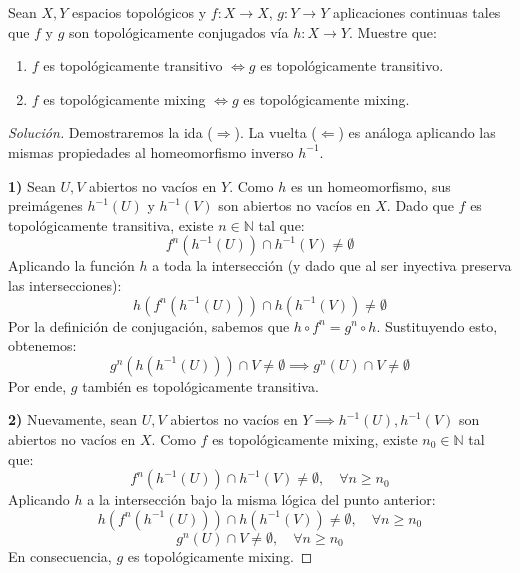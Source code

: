 \begin{ejercicio}
	Sean $X, Y$ espacios topológicos y $f: X \to X$, $g: Y \to Y$ aplicaciones continuas tales que $f$ y $g$ son topológicamente conjugados vía $h: X \to Y$. Muestre que:
	\begin{enumerate}[1)]
		\item $f$ es topológicamente transitivo $\iff g$ es topológicamente transitivo.
		\item $f$ es topológicamente mixing $\iff g$ es topológicamente mixing.
	\end{enumerate}
\end{ejercicio}
\begin{proof}[Solución]
	Demostraremos la ida ($\Rightarrow$). La vuelta ($\Leftarrow$) es análoga aplicando las mismas propiedades al homeomorfismo inverso $h^{-1}$.
	
	\textbf{1)} Sean $U, V$ abiertos no vacíos en $Y$. Como $h$ es un homeomorfismo, sus preimágenes $h^{-1}(U)$ y $h^{-1}(V)$ son abiertos no vacíos en $X$.
	Dado que $f$ es topológicamente transitiva, existe $n \in \mathbb{N}$ tal que:
	$$ f^n(h^{-1}(U)) \cap h^{-1}(V) \neq \emptyset $$
	Aplicando la función $h$ a toda la intersección (y dado que al ser inyectiva preserva las intersecciones):
	$$ h\left(f^n(h^{-1}(U))\right) \cap h(h^{-1}(V)) \neq \emptyset $$
	Por la definición de conjugación, sabemos que $h \circ f^n = g^n \circ h$. Sustituyendo esto, obtenemos:
	$$ g^n(h(h^{-1}(U))) \cap V \neq \emptyset \implies g^n(U) \cap V \neq \emptyset $$
	Por ende, $g$ también es topológicamente transitiva.
	
	\textbf{2)} Nuevamente, sean $U, V$ abiertos no vacíos en $Y \implies h^{-1}(U), h^{-1}(V)$ son abiertos no vacíos en $X$.
	Como $f$ es topológicamente mixing, existe $n_0 \in \mathbb{N}$ tal que:
	$$ f^n(h^{-1}(U)) \cap h^{-1}(V) \neq \emptyset, \quad \forall n \ge n_0 $$
	Aplicando $h$ a la intersección bajo la misma lógica del punto anterior:
	$$ h\left(f^n(h^{-1}(U))\right) \cap h(h^{-1}(V)) \neq \emptyset, \quad \forall n \ge n_0 $$
	$$ g^n(U) \cap V \neq \emptyset, \quad \forall n \ge n_0 $$
	En consecuencia, $g$ es topológicamente mixing.
\end{proof}

